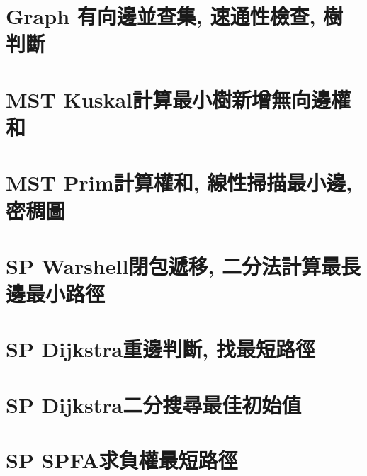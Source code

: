 \documentclass{article}
\begin{document}
\begin{multicols}{2}
\section{Graph 有向邊並查集, 速通性檢查, 樹判斷}



\section{MST Kuskal計算最小樹新增無向邊權和}



\section{MST Prim計算權和, 線性掃描最小邊, 密稠圖}



\section{SP Warshell閉包遞移, 二分法計算最長邊最小路徑}



\section{SP Dijkstra重邊判斷, 找最短路徑}



\section{SP Dijkstra二分搜尋最佳初始值}



\section{SP SPFA求負權最短路徑}




\end{multicols}
\end{document}
